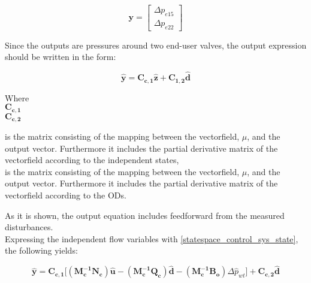 \begin{equation}
\bm{y} =
\begin{bmatrix} 
\Delta p_{e15} \\
\Delta p_{e22} 
\label{outputvector_control}
\end{bmatrix} 
\end{equation}

Since the outputs are pressures around two end-user valves, the output expression should be written in the form:

\begin{equation}
  \bm{\hat{y}} = \bm{C_{c,1}} \bm{\hat{z}} + \bm{C_{1,2}} \bm{\hat{d}}  
   \label{statespace_control_output}
\end{equation}

\begin{minipage}[t]{0.20\textwidth}
Where\\
\hspace*{8mm} $\bm{C_{c,1}}$ \\
\newline
\newline
\newline
\hspace*{8mm} $\bm{C_{c,2}}$ 
\end{minipage}
\begin{minipage}[t]{0.68\textwidth}
\vspace*{2mm}
is the matrix consisting of the mapping between the vectorfield, $\mu$, and the output vector. Furthermore it includes the partial derivative matrix of the vectorfield according to the independent states, \\
is the matrix consisting of the mapping between the vectorfield, $\mu$, and the output vector. Furthermore it includes the partial derivative matrix of the vectorfield according to the ODs.
\end{minipage}

As it is shown, the output equation includes feedforward from the measured disturbances. 
\\
Expressing the independent flow variables with \eqref{statespace_control_sys_state}, the following yields: 

\begin{equation}
  \bm{\hat{y}} = \bm{C_{c,1}} \big[ (\bm{M_c^{-1}}\bm{N_c}) \bm{\hat{u}} - (\bm{M_c^{-1}}\bm{Q_c}) \bm{\hat{d}} - (\bm{M_c^{-1}}\bm{B_o}) \Delta \hat{p}_{wt}\big] + \bm{C_{c,2}} \bm{\hat{d}}  
   \label{statespace_control_output}
\end{equation}

